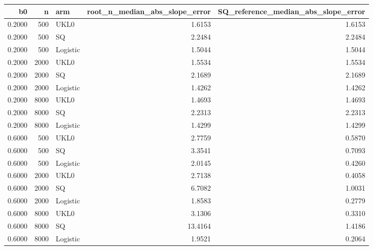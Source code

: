 \begin{tabular}{rrlrr}
\toprule
b0 & n & arm & root\_n\_median\_abs\_slope\_error & SQ\_reference\_median\_abs\_slope\_error \\
\midrule
0.2000 & 500 & UKL0 & 1.6153 & 1.6153 \\
0.2000 & 500 & SQ & 2.2484 & 2.2484 \\
0.2000 & 500 & Logistic & 1.5044 & 1.5044 \\
0.2000 & 2000 & UKL0 & 1.5534 & 1.5534 \\
0.2000 & 2000 & SQ & 2.1689 & 2.1689 \\
0.2000 & 2000 & Logistic & 1.4262 & 1.4262 \\
0.2000 & 8000 & UKL0 & 1.4693 & 1.4693 \\
0.2000 & 8000 & SQ & 2.2313 & 2.2313 \\
0.2000 & 8000 & Logistic & 1.4299 & 1.4299 \\
0.6000 & 500 & UKL0 & 2.7759 & 0.5870 \\
0.6000 & 500 & SQ & 3.3541 & 0.7093 \\
0.6000 & 500 & Logistic & 2.0145 & 0.4260 \\
0.6000 & 2000 & UKL0 & 2.7138 & 0.4058 \\
0.6000 & 2000 & SQ & 6.7082 & 1.0031 \\
0.6000 & 2000 & Logistic & 1.8583 & 0.2779 \\
0.6000 & 8000 & UKL0 & 3.1306 & 0.3310 \\
0.6000 & 8000 & SQ & 13.4164 & 1.4186 \\
0.6000 & 8000 & Logistic & 1.9521 & 0.2064 \\
\bottomrule
\end{tabular}
